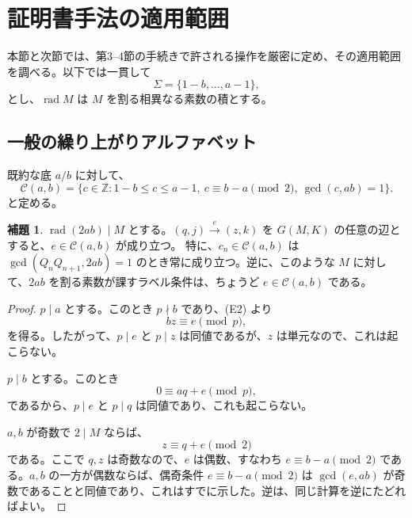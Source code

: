 \documentclass[11pt,reqno]{amsart}
\theoremstyle{definition}
\newtheorem{lemma}[theorem]{補題}
\theoremstyle{definition}
\theoremstyle{remark}
\begin{document}
\section{証明書手法の適用範囲}\label{sec:7}

本節と次節では、第3--4節の手続きで許される操作を厳密に定め、その適用範囲を調べる。以下では一貫して
\[
\Sigma=\{1-b,\ldots,a-1\},
\]
とし、\(\operatorname{rad}M\) は \(M\) を割る相異なる素数の積とする。

\subsection{一般の繰り上がりアルファベット}\label{sec:7.1}

既約な底 \(a/b\) に対して、
\[
\mathcal C(a,b)=\{c\in\mathbb Z:1-b\le c\le a-1,\ c\equiv b-a\pmod2,\
\gcd(c,ab)=1\}.
\tag{26}\label{eq:26}
\]
と定める。

\begin{samepage}
\begin{lemma}\leavevmode\label{thm:29}
\(\operatorname{rad}(2ab)\mid M\) とする。\((q,j)\xrightarrow{e}(z,k)\) を \(G(M,K)\) の任意の辺とすると、\(e\in\mathcal C(a,b)\) が成り立つ。
特に、\(c_n\in\mathcal C(a,b)\) は \(\gcd(Q_nQ_{n+1},2ab)=1\) のとき常に成り立つ。逆に、このような \(M\) に対して、\(2ab\) を割る素数が課すラベル条件は、ちょうど \(e\in\mathcal C(a,b)\) である。
\label{thm-end:29}
\end{lemma}
\end{samepage}

\begin{proof}\leavevmode\label{proof:29}
\(p\mid a\) とする。このとき \(p\nmid b\) であり、(E2) より
\[
bz\equiv e\pmod p,
\]
を得る。したがって、\(p\mid e\) と \(p\mid z\) は同値であるが、\(z\) は単元なので、これは起こらない。

\(p\mid b\) とする。このとき
\[
0\equiv aq+e\pmod p,
\]
であるから、\(p\mid e\) と \(p\mid q\) は同値であり、これも起こらない。

\(a,b\) が奇数で \(2\mid M\) ならば、
\[
z\equiv q+e\pmod2
\]
である。ここで \(q,z\) は奇数なので、\(e\) は偶数、すなわち \(e\equiv b-a\pmod2\) である。\(a,b\) の一方が偶数ならば、偶奇条件 \(e\equiv b-a\pmod2\) は \(\gcd(e,ab)\) が奇数であることと同値であり、これはすでに示した。逆は、同じ計算を逆にたどればよい。\qedhere
\end{proof}
\end{document}
